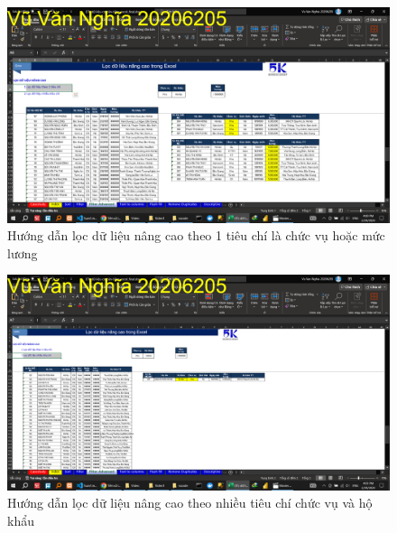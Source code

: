 \documentclass{article}
\begin{document}
\begin{figure}[h]
\centering
\includegraphics[scale = 0.15]{Video1/HuongDan/6.png}
\caption{Hướng dẫn lọc dữ liệu nâng cao theo 1 tiêu chí là chức vụ hoặc mức lương}
\end{figure}
\begin{figure}[h]
\centering
\includegraphics[scale = 0.15]{Video1/HuongDan/7.png}
\caption{Hướng dẫn lọc dữ liệu nâng cao theo nhiều tiêu chí chức vụ và hộ khẩu}
\end{figure}
\end{document}
